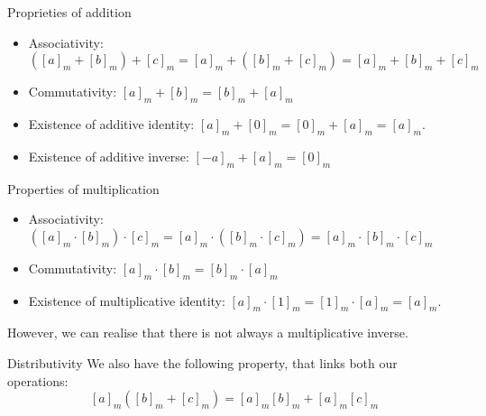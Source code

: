 \documentclass[a4paper]{article}
\begin{document}
\begin{parag}{Proprieties of addition}
    \begin{itemize}[left=0pt]
        \item Associativity: $\displaystyle \left(\left[a\right]_m + \left[b\right]_m\right) + \left[c\right]_m = \left[a\right]_m + \left(\left[b\right]_m + \left[c\right]_m\right) = \left[a\right]_m + \left[b\right]_m + \left[c\right]_m$
            
        \item Commutativity: $\left[a\right]_m + \left[b\right]_m = \left[b\right]_m + \left[a\right]_m$
            
        \item Existence of additive identity: $\left[a\right]_m + \left[0\right]_m = \left[0\right]_m + \left[a\right]_m = \left[a\right]_m$.
            
        \item Existence of additive inverse: $\left[-a\right]_m + \left[a\right]_m = \left[0\right]_m$
    \end{itemize}
\end{parag}

\begin{parag}{Properties of multiplication}
    \begin{itemize}[left=0pt]
        \item Associativity: $\displaystyle \left(\left[a\right]_m \cdot \left[b\right]_m\right) \cdot \left[c\right]_m = \left[a\right]_m \cdot \left(\left[b\right]_m \cdot \left[c\right]_m\right) = \left[a\right]_m \cdot \left[b\right]_m \cdot \left[c\right]_m$
            
        \item Commutativity: $\left[a\right]_m \cdot \left[b\right]_m = \left[b\right]_m \cdot \left[a\right]_m$
            
        \item Existence of multiplicative identity: $\left[a\right]_m \cdot \left[1\right]_m = \left[1\right]_m \cdot \left[a\right]_m = \left[a\right]_m$.
    \end{itemize}

    However, we can realise that there is not always a multiplicative inverse.
\end{parag}

\begin{parag}{Distributivity}
    We also have the following property, that links both our operations: 
    \[\left[a\right]_m \left(\left[b\right]_m + \left[c\right]_m\right) = \left[a\right]_m \left[b\right]_m + \left[a\right]_m \left[c\right]_m\]
\end{parag}
\end{document}
